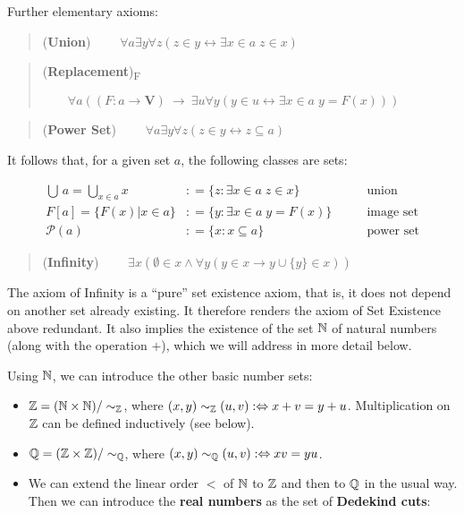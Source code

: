 Further elementary axioms:

\begin{quote}
(\textbf{Union})   $\qquad \forall a \exists y \forall z (z \in y  \leftrightarrow  \exists x \in a \; z \in x)$
\end{quote}

\begin{quote}
(\textbf{Replacement})\textsubscript{F} \newline

$\qquad \forall a  ((F: a \to \mathbf{V}) \: \rightarrow \: \exists u \forall y (y \in u \leftrightarrow \exists x \in a \; y = F(x)))$
\end{quote}

\begin{quote}
(\textbf{Power Set}) $\qquad \forall a \exists y \forall z (z \in y \leftrightarrow z \subseteq a)$
\end{quote}

It follows that, for a given set $a$, the following classes are sets:

\begin{align*}
\bigcup \, a = \bigcup_{x \in a} x & : = \{z \colon \exists x \in a \; z \in x \}  &  \qquad  \text{union}\\
F[a] = \{F(x)|x \in a\} &: = \{y\colon \exists x \in a \; y = F(x) \}  &  \qquad  \text{image set}\\
\mathcal{P}(a) &: = \{x\colon x \subseteq a\} & \qquad  \text{power set}
\end{align*}

\begin{quote}
(\textbf{Infinity}) $\qquad \exists x ( \emptyset \in x \wedge \forall y ( y \in x \to y \cup \{y\} \in x))$
\end{quote}

The axiom of Infinity is a ``pure'' set existence axiom, that is, it does not depend on another set already existing. It therefore renders the axiom of Set Existence above redundant.
It also implies the existence of the set $\mathbb{N}$ of natural numbers (along with the operation $+$), which we will address in more detail below.

Using $\mathbb{N}$, we can introduce the other basic number sets:

\begin{itemize}
\item $\mathbb{Z} = (\mathbb{N}\times\mathbb{N})/ \sim_{\mathbb{Z}}$, where $(x,y) \sim_{\mathbb{Z}} (u,v) :\Leftrightarrow  x+v = y+u$. Multiplication on $\mathbb{Z}$ can be defined inductively (see below).
\item $\mathbb{Q} = (\mathbb{Z}\times\mathbb{Z})/\sim_{\mathbb{Q}}$, where $(x,y) \sim_{\mathbb{Q}} (u,v) :\Leftrightarrow xv = yu$.
\item We can extend the linear order $<$ of $\mathbb{N}$ to $\mathbb{Z}$ and then to $\mathbb{Q}$ in the usual way. Then we can introduce the \textbf{real numbers} as the set of \textbf{Dedekind cuts}:
\end{itemize}

